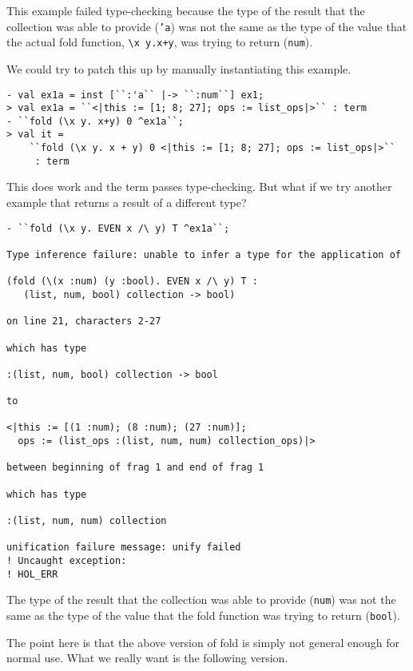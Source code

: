 This example failed type-checking because the type of the result that the collection
was able to provide (\texttt{'a})
was not the same as the type of the value that the actual fold
function, \verb|\|\texttt{x~y.x+y}, was trying to return (\texttt{num}).

We could try to patch this up by manually instantiating this example.
\begin{session}
\begin{verbatim}
- val ex1a = inst [``:'a`` |-> ``:num``] ex1;
> val ex1a = ``<|this := [1; 8; 27]; ops := list_ops|>`` : term
- ``fold (\x y. x+y) 0 ^ex1a``;
> val it =
    ``fold (\x y. x + y) 0 <|this := [1; 8; 27]; ops := list_ops|>``
     : term
\end{verbatim}
\end{session}

This does work and the term passes type-checking. But what if we try another example
that returns a result of a different type?
\begin{session}
\begin{verbatim}
- ``fold (\x y. EVEN x /\ y) T ^ex1a``;

Type inference failure: unable to infer a type for the application of

(fold (\(x :num) (y :bool). EVEN x /\ y) T :
   (list, num, bool) collection -> bool)

on line 21, characters 2-27

which has type

:(list, num, bool) collection -> bool

to

<|this := [(1 :num); (8 :num); (27 :num)];
  ops := (list_ops :(list, num, num) collection_ops)|>

between beginning of frag 1 and end of frag 1

which has type

:(list, num, num) collection

unification failure message: unify failed
! Uncaught exception: 
! HOL_ERR
\end{verbatim}
\end{session}

The type of the result that the collection was able to provide (\texttt{num})
was not the same as the type of the value that the fold
function was trying to return (\texttt{bool}).


The point here is that the above version of fold is simply not general enough for
normal use.
What we really want is the following version.


